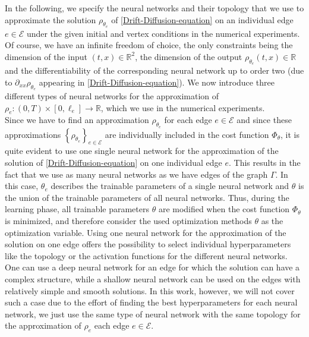 In the following, we specify the neural networks and their topology that we use to approximate the solution $\rho_{\theta_e}$ of \cref{Drift-Diffusion-equation} on an individual edge $e \in \mathcal{E}$ under the given initial and vertex conditions in the numerical experiments. Of course, we have an infinite freedom of choice, the only constraints being the dimension of the input $\left(t, x\right) \in \mathbb{R}^2$, the dimension of the output $\rho_{\theta_e}\left(t, x\right) \in \mathbb{R}$ and the differentiability of the corresponding neural network up to order two (due to $\partial_{xx} \rho_{\theta_e}$ appearing in \cref{Drift-Diffusion-equation}). We now introduce three different types of neural networks for the approximation of $\rho_e \colon \left(0, T\right) \times \left[0, \ell_e\right] \to \mathbb{R}$, which we use in the numerical experiments. \\
Since we have to find an approximation $\rho_{\theta_e}$ for each edge $e \in \mathcal{E}$ and since these approximations $\left\{ \rho_{\theta_e} \right\}_{e \in \mathcal{E}}$ are individually included in the cost function $\Phi_{\theta}$, it is quite evident to use one single neural network for the approximation of the solution of \cref{Drift-Diffusion-equation} on one individual edge $e$. This results in the fact that we use as many neural networks as we have edges of the graph $\Gamma$. In this case, $\theta_e$ describes the trainable parameters of a single neural network and $\theta$ is the union of the trainable parameters of all neural networks. Thus, during the learning phase, all trainable parameters $\theta$ are modified when the cost function $\Phi_{\theta}$ is minimized, and therefore consider the used optimization methods $\theta$ as the optimization variable. Using one neural network for the approximation of the solution on one edge offers the possibility to select individual hyperparameters like the topology or the activation functions for the different neural networks. One can use a deep neural network for an edge for which the solution can have a complex structure, while a shallow neural network can be used on the edges with relatively simple and smooth solutions. In this work, however, we will not cover such a case due to the effort of finding the best hyperparameters for each neural network, we just use the same type of neural network with the same topology for the approximation of $\rho_e$ each edge $e \in \mathcal{E}$. \\

